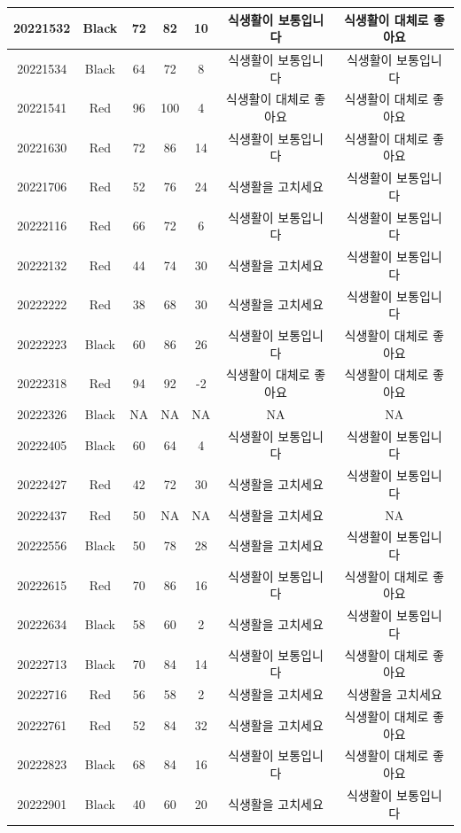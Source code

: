 \documentclass[
]{book}
\begin{document}
\begin{tabular}{c|c|c|c|c|c|c}
\hline
20221532 & Black & 72 & 82 & 10 & 식생활이 보통입니다 & 식생활이 대체로 좋아요\\
\hline
20221534 & Black & 64 & 72 & 8 & 식생활이 보통입니다 & 식생활이 보통입니다\\
\hline
20221541 & Red & 96 & 100 & 4 & 식생활이 대체로 좋아요 & 식생활이 대체로 좋아요\\
\hline
20221630 & Red & 72 & 86 & 14 & 식생활이 보통입니다 & 식생활이 대체로 좋아요\\
\hline
20221706 & Red & 52 & 76 & 24 & 식생활을 고치세요 & 식생활이 보통입니다\\
\hline
20222116 & Red & 66 & 72 & 6 & 식생활이 보통입니다 & 식생활이 보통입니다\\
\hline
20222132 & Red & 44 & 74 & 30 & 식생활을 고치세요 & 식생활이 보통입니다\\
\hline
20222222 & Red & 38 & 68 & 30 & 식생활을 고치세요 & 식생활이 보통입니다\\
\hline
20222223 & Black & 60 & 86 & 26 & 식생활이 보통입니다 & 식생활이 대체로 좋아요\\
\hline
20222318 & Red & 94 & 92 & -2 & 식생활이 대체로 좋아요 & 식생활이 대체로 좋아요\\
\hline
20222326 & Black & NA & NA & NA & NA & NA\\
\hline
20222405 & Black & 60 & 64 & 4 & 식생활이 보통입니다 & 식생활이 보통입니다\\
\hline
20222427 & Red & 42 & 72 & 30 & 식생활을 고치세요 & 식생활이 보통입니다\\
\hline
20222437 & Red & 50 & NA & NA & 식생활을 고치세요 & NA\\
\hline
20222556 & Black & 50 & 78 & 28 & 식생활을 고치세요 & 식생활이 보통입니다\\
\hline
20222615 & Red & 70 & 86 & 16 & 식생활이 보통입니다 & 식생활이 대체로 좋아요\\
\hline
20222634 & Black & 58 & 60 & 2 & 식생활을 고치세요 & 식생활이 보통입니다\\
\hline
20222713 & Black & 70 & 84 & 14 & 식생활이 보통입니다 & 식생활이 대체로 좋아요\\
\hline
20222716 & Red & 56 & 58 & 2 & 식생활을 고치세요 & 식생활을 고치세요\\
\hline
20222761 & Red & 52 & 84 & 32 & 식생활을 고치세요 & 식생활이 대체로 좋아요\\
\hline
20222823 & Black & 68 & 84 & 16 & 식생활이 보통입니다 & 식생활이 대체로 좋아요\\
\hline
20222901 & Black & 40 & 60 & 20 & 식생활을 고치세요 & 식생활이 보통입니다\\

\end{tabular}
\end{document}

